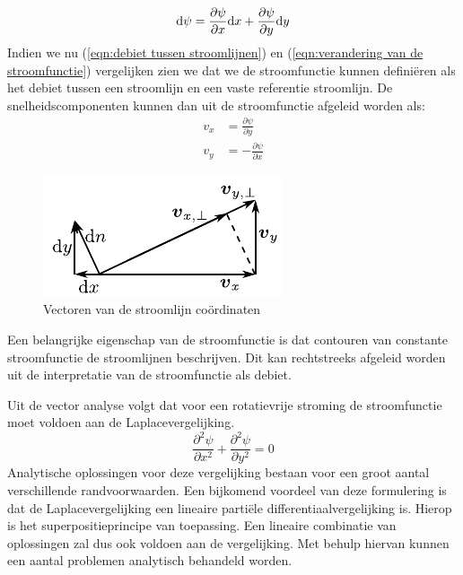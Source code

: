 \begin{equation}
	\mathrm{d} \psi = \frac{\partial \psi}{\partial x} \mathrm{d} x + \frac{\partial \psi}{\partial y} \mathrm{d} y
	\label{eqn:verandering van de stroomfunctie}
\end{equation}
Indien we nu (\ref{eqn:debiet tussen stroomlijnen}) en (\ref{eqn:verandering van de stroomfunctie}) vergelijken zien we dat we de stroomfunctie kunnen definiëren als het debiet tussen een stroomlijn en een vaste referentie stroomlijn. De snelheidscomponenten kunnen dan uit de stroomfunctie afgeleid worden als:
\begin{align}
	v_x &=  \frac{\partial \psi}{\partial y} \\
	v_y &= -\frac{\partial \psi}{\partial x}
\end{align}
\begin{figure}[htb]
	\centering
	\includegraphics{fig/uitwendige_stroming/Stroomlijnen}
	\caption{Vectoren van de stroomlijn coördinaten}
	\label{fig:Stroomlijn coordinaten}
\end{figure}
Een belangrijke eigenschap van de stroomfunctie is dat contouren van constante stroomfunctie de stroomlijnen beschrijven. Dit kan rechtstreeks afgeleid worden uit de interpretatie van de stroomfunctie als debiet.

Uit de vector analyse volgt dat voor een rotatievrije stroming de stroomfunctie moet voldoen aan de Laplacevergelijking.
\begin{equation}
	\frac{\partial^2 \psi}{\partial x^2} + \frac{\partial^2 \psi}{\partial y^2} = 0
	\label{eqn:laplacevergelijking}
\end{equation}
Analytische oplossingen voor deze vergelijking bestaan voor een groot aantal verschillende randvoorwaarden. Een bijkomend voordeel van deze formulering is dat de Laplacevergelijking een lineaire partiële differentiaalvergelijking is. Hierop is het superpositieprincipe van toepassing. Een lineaire combinatie van oplossingen zal dus ook voldoen aan de vergelijking. Met behulp hiervan kunnen een aantal problemen analytisch behandeld worden.

